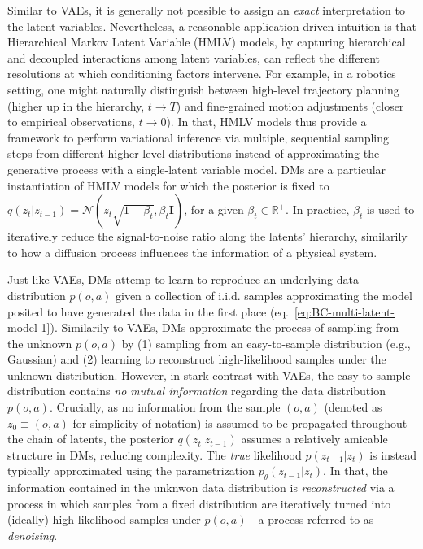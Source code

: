 Similar to VAEs, it is generally not possible to assign an \emph{exact} interpretation to the latent variables. 
Nevertheless, a reasonable application-driven intuition is that Hierarchical Markov Latent Variable (HMLV) models, by capturing hierarchical and decoupled interactions among latent variables, can reflect the different resolutions at which conditioning factors intervene. 
For example, in a robotics setting, one might naturally distinguish between high-level trajectory planning (higher up in the hierarchy, \(t \to T\)) and fine-grained motion adjustments (closer to empirical observations, \(t \to 0\)).
In that, HMLV models thus provide a framework to perform variational inference via multiple, sequential sampling steps from different higher level distributions instead of approximating the generative process with a single-latent variable model.
DMs are a particular instantiation of HMLV models for which the posterior is fixed to \( q( z_t \vert z_{t-1}) = \mathcal N(z_t \sqrt{1-\beta_t}, \beta_t \mathbf{I}) \), for a given \( \beta_t \in \mathbb R^+ \). 
In practice, \( \beta_t \) is used to iteratively reduce the signal-to-noise ratio along the latents' hierarchy, similarily to how a diffusion process influences the information of a physical system.

Just like VAEs, DMs attemp to learn to reproduce an underlying data distribution \( p (o,a) \) given a collection of i.i.d. samples approximating the model posited to have generated the data in the first place (eq.~\ref{eq:BC-multi-latent-model-1}).
Similarily to VAEs, DMs approximate the process of sampling from the unknown \( p(o,a) \) by (1) sampling from an easy-to-sample distribution (e.g., Gaussian) and (2) learning to reconstruct high-likelihood samples under the unknown distribution.
However, in stark contrast with VAEs, the easy-to-sample distribution contains \emph{no mutual information} regarding the data distribution \( p(o,a) \).
Crucially, as no information from the sample \( (o,a) \) (denoted as \( z_0 \equiv (o,a) \) for simplicity of notation) is assumed to be propagated throughout the chain of latents, the posterior \( q(z_t \vert z_{t-1})\) assumes a relatively amicable structure in DMs, reducing complexity.
The \emph{true} likelihood \( p(z_{t-1} \vert z_t) \) is instead typically approximated using the parametrization \(  p_\theta (z_{t-1} \vert z_t) \).
In that, the information contained in the unknwon data distribution is \emph{reconstructed} via a process in which samples from a fixed distribution are iteratively turned into (ideally) high-likelihood samples under \( p(o,a) \)---a process referred to as \emph{denoising}.

